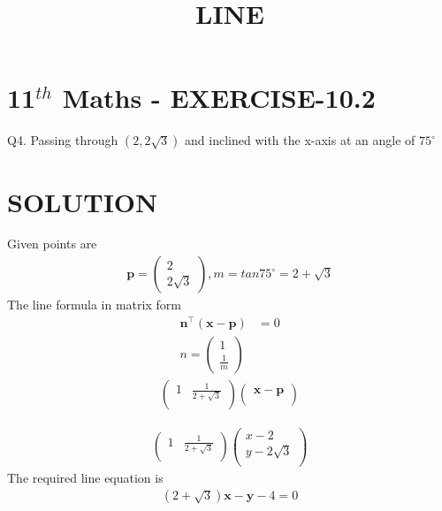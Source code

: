 \documentclass[12pt]{article}
\providecommand{\brak}[1]{\ensuremath{\left(#1\right)}}
\newcommand{\myvec}[1]{\ensuremath{\begin{pmatrix}#1\end{pmatrix}}}
\let\vec\mathbf
\begin{document}
\begin{center}
\title{\textbf{LINE}}
\date{\vspace{-5ex}} %
\maketitle
\end{center}

\section{11$^{th}$ Maths - EXERCISE-10.2}
Q4. Passing through $(2,2\sqrt{3})$ and inclined with the x-axis at an angle of $75^\circ$
\section{SOLUTION}
Given points are 
\begin{align}
\vec{p}=\myvec{2\\ 2\sqrt{3}},
m=tan75^\circ=2+\sqrt{3}
\end{align}
The line formula in matrix form
\begin{align}
\vec{n}^\top\brak{\vec{x}-\vec{p}} &= 0 \\
n=\myvec{1\\ \frac{1}{m}}
\end{align}
\begin{align}
\begin{pmatrix}
    1 &\frac{1}{2+\sqrt{3}}\\
\end{pmatrix}\begin{pmatrix}
    \vec{x}-\vec{p}\\
\end{pmatrix}
\end{align}

\begin{align}
 \begin{pmatrix}
    1 & \frac{1}{2+\sqrt{3}}\\
\end{pmatrix}\begin{pmatrix}
    x-2\\
    y-2\sqrt{3}\\
\end{pmatrix}
\end{align}
The required line equation is 
\begin{align}
 (2+\sqrt{3})\vec{x}-\vec{y}-4=0
\end{align} 
\end{document}
